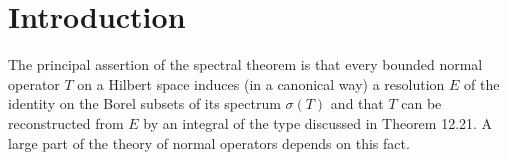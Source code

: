 \chapter{Introduction}

The principal assertion of the spectral theorem is that every bounded normal operator $T$ on a Hilbert space induces (in a canonical way) a resolution $E$ of the identity on the Borel subsets of its spectrum $\sigma(T)$ and that $T$ can be reconstructed from $E$ by an integral of the type discussed in Theorem 12.21.
A large part of the theory of normal operators depends on this fact.

